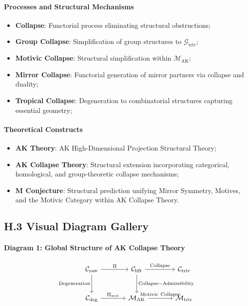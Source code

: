 \documentclass[11pt]{article}
\begin{document}
\paragraph{Processes and Structural Mechanisms}

\begin{itemize}
    \item \textbf{Collapse}: Functorial process eliminating structural obstructions;
    \item \textbf{Group Collapse}: Simplification of group structures to $\mathcal{G}_{\mathrm{triv}}$;
    \item \textbf{Motivic Collapse}: Structural simplification within $\mathcal{M}_{\mathrm{AK}}$;
    \item \textbf{Mirror Collapse}: Functorial generation of mirror partners via collapse and duality;
    \item \textbf{Tropical Collapse}: Degeneration to combinatorial structures capturing essential geometry;
\end{itemize}

\paragraph{Theoretical Constructs}

\begin{itemize}
    \item \textbf{AK Theory}: AK High-Dimensional Projection Structural Theory;
    \item \textbf{AK Collapse Theory}: Structural extension incorporating categorical, homological, and group-theoretic collapse mechanisms;
    \item \textbf{M Conjecture}: Structural prediction unifying Mirror Symmetry, Motives, and the Motivic Category within AK Collapse Theory.
\end{itemize}

\subsection*{H.3 Visual Diagram Gallery}

\paragraph{Diagram 1: Global Structure of AK Collapse Theory}

\[
\begin{tikzcd}[row sep=large, column sep=large]
\mathcal{C}_{\mathrm{raw}} \arrow[r, "\Pi"] \arrow[d, "\mathrm{Degeneration}"']
& \mathcal{C}_{\mathrm{lift}} \arrow[r, "\mathrm{Collapse}"] \arrow[d, "\mathrm{Collapse-Admissibility}"]
& \mathcal{C}_{\mathrm{triv}} \\
\mathcal{C}_{\mathrm{deg}} \arrow[r, "\Pi_{\mathrm{mot}}"]
& \mathcal{M}_{\mathrm{AK}} \arrow[r, "\mathrm{Motivic\ Collapse}"]
& \mathcal{M}_{\mathrm{triv}}
\end{tikzcd}
\]
\end{document}
